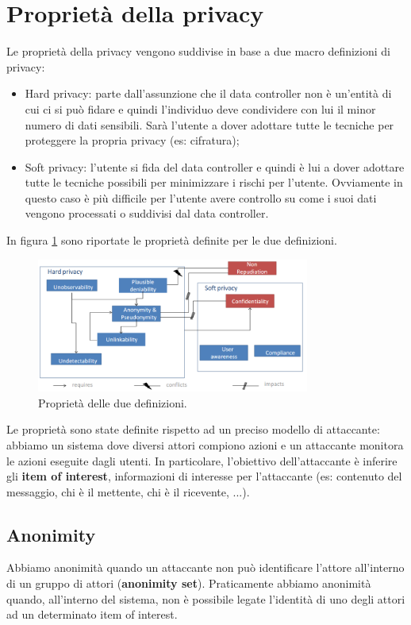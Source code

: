 \section{Proprietà della privacy}
Le proprietà della privacy vengono suddivise in base a due macro definizioni di privacy:
\begin{itemize}
    \item Hard privacy: parte dall'assunzione che il data controller non è un'entità di cui ci si può fidare e quindi l'individuo deve condividere con lui il minor numero di dati sensibili. Sarà l'utente a dover adottare tutte le tecniche per proteggere la propria privacy (es: cifratura);
    \item Soft privacy: l'utente si fida del data controller e quindi è lui a dover adottare tutte le tecniche possibili per minimizzare i rischi per l'utente. Ovviamente in questo caso è più difficile per l'utente avere controllo su come i suoi dati vengono processati o suddivisi dal data controller.
\end{itemize}

\noindent In figura \ref{fig:12-1} sono riportate le proprietà definite per le due definizioni.

\begin{figure}
    \centering
    \includegraphics[width=0.8\textwidth]{images/12-1.png}
    \caption{Proprietà delle due definizioni.}
    \label{fig:12-1}
\end{figure}

\noindent Le proprietà sono state definite rispetto ad un preciso modello di attaccante: abbiamo un sistema dove diversi attori compiono azioni e un attaccante monitora le azioni eseguite dagli utenti. In particolare, l'obiettivo dell'attaccante è inferire gli \textbf{item of interest}, informazioni di interesse per l'attaccante (es: contenuto del messaggio, chi è il mettente, chi è il ricevente, ...).

\subsection{Anonimity}
Abbiamo anonimità quando un attaccante non può identificare l'attore all'interno di un gruppo di attori (\textbf{anonimity set}). Praticamente abbiamo anonimità quando, all'interno del sistema, non è possibile legate l'identità di uno degli attori ad un determinato item of interest.

